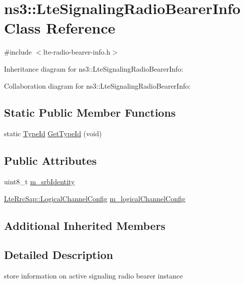 \hypertarget{classns3_1_1LteSignalingRadioBearerInfo}{}\section{ns3\+:\+:Lte\+Signaling\+Radio\+Bearer\+Info Class Reference}
\label{classns3_1_1LteSignalingRadioBearerInfo}


{\ttfamily \#include $<$lte-\/radio-\/bearer-\/info.\+h$>$}



Inheritance diagram for ns3\+:\+:Lte\+Signaling\+Radio\+Bearer\+Info\+:


Collaboration diagram for ns3\+:\+:Lte\+Signaling\+Radio\+Bearer\+Info\+:
\subsection*{Static Public Member Functions}
\begin{DoxyCompactItemize}
\item 
static \hyperlink{classns3_1_1TypeId}{Type\+Id} \hyperlink{classns3_1_1LteSignalingRadioBearerInfo_a2adabf2e88083721638845fa0e0bb935}{Get\+Type\+Id} (void)
\end{DoxyCompactItemize}
\subsection*{Public Attributes}
\begin{DoxyCompactItemize}
\item 
uint8\+\_\+t \hyperlink{classns3_1_1LteSignalingRadioBearerInfo_ac799eb6395891e0df65c41776b16df60}{m\+\_\+srb\+Identity}
\item 
\hyperlink{structns3_1_1LteRrcSap_1_1LogicalChannelConfig}{Lte\+Rrc\+Sap\+::\+Logical\+Channel\+Config} \hyperlink{classns3_1_1LteSignalingRadioBearerInfo_a4dbfd06388abd08d6995cb02441f9032}{m\+\_\+logical\+Channel\+Config}
\end{DoxyCompactItemize}
\subsection*{Additional Inherited Members}


\subsection{Detailed Description}
store information on active signaling radio bearer instance 

